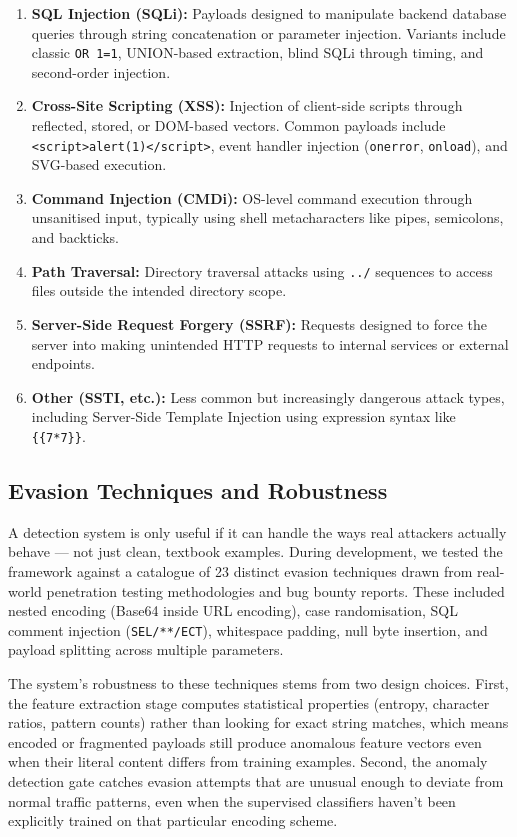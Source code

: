 \documentclass[journal,onecolumn]{IEEEtran}
\begin{document}
\begin{enumerate}
\item \textbf{SQL Injection (SQLi):} Payloads designed to manipulate backend database queries through string concatenation or parameter injection. Variants include classic \texttt{OR 1=1}, UNION-based extraction, blind SQLi through timing, and second-order injection.
\item \textbf{Cross-Site Scripting (XSS):} Injection of client-side scripts through reflected, stored, or DOM-based vectors. Common payloads include \texttt{<script>alert(1)</script>}, event handler injection (\texttt{onerror}, \texttt{onload}), and SVG-based execution.
\item \textbf{Command Injection (CMDi):} OS-level command execution through unsanitised input, typically using shell metacharacters like pipes, semicolons, and backticks.
\item \textbf{Path Traversal:} Directory traversal attacks using \texttt{../} sequences to access files outside the intended directory scope.
\item \textbf{Server-Side Request Forgery (SSRF):} Requests designed to force the server into making unintended HTTP requests to internal services or external endpoints.
\item \textbf{Other (SSTI, etc.):} Less common but increasingly dangerous attack types, including Server-Side Template Injection using expression syntax like \texttt{\{\{7*7\}\}}.
\end{enumerate}

\subsection{Evasion Techniques and Robustness}

A detection system is only useful if it can handle the ways real attackers actually behave --- not just clean, textbook examples. During development, we tested the framework against a catalogue of 23 distinct evasion techniques drawn from real-world penetration testing methodologies and bug bounty reports. These included nested encoding (Base64 inside URL encoding), case randomisation, SQL comment injection (\texttt{SEL/**/ECT}), whitespace padding, null byte insertion, and payload splitting across multiple parameters.

The system's robustness to these techniques stems from two design choices. First, the feature extraction stage computes statistical properties (entropy, character ratios, pattern counts) rather than looking for exact string matches, which means encoded or fragmented payloads still produce anomalous feature vectors even when their literal content differs from training examples. Second, the anomaly detection gate catches evasion attempts that are unusual enough to deviate from normal traffic patterns, even when the supervised classifiers haven't been explicitly trained on that particular encoding scheme.
\end{document}
